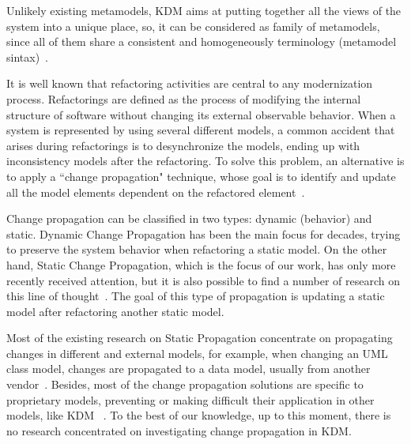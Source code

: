 Unlikely existing metamodels, KDM aims at putting together all the  views of the system into a unique place, so, it can be considered as family of metamodels, since all of them share a consistent and homogeneously terminology (metamodel sintax)~\cite{murduck}. %

It is well known that refactoring activities are central to any modernization process. Refactorings are defined as the process of modifying the internal structure of software without changing its external observable behavior\cite{refactImpro}. When a system is represented by using several different models, a common accident that arises during refactorings is  to desynchronize the models, ending up with inconsistency models after the refactoring. To solve this problem, an alternative is to apply a ``change propagation"  technique, whose goal is to identify and update all the model elements dependent on the refactored element~\cite{4440135, Mens:2006:TMT:1706639.1706924, Mens:2006_NEW, Mens:2007}.

Change propagation can be classified in two types: dynamic (behavior) and static. Dynamic  Change Propagation has been the main focus for decades, trying to preserve the system behavior when refactoring a static model. On the other hand, Static Change Propagation, which is the focus of our work, has only more recently received attention, but it is also possible to find a number of research on this line of thought~\cite{4440135, Mens:2006:TMT:1706639.1706924, Mens:2006_NEW, Mens:2007}. The goal of this type of propagation is updating a static model after refactoring another static model.  

Most of the existing research on Static Propagation concentrate on propagating changes in different and external models, for example, when changing an UML class model, changes are propagated to a data model, usually from another vendor~\cite{Supporting_change_propagation_in_UML_models}. Besides, most of the change propagation solutions are specific to proprietary models, preventing or making difficult their application in other models, like KDM ~\cite{4440135, Mens:2007}. To the best of our knowledge, up to this moment, there is no research concentrated on investigating change propagation in KDM.

